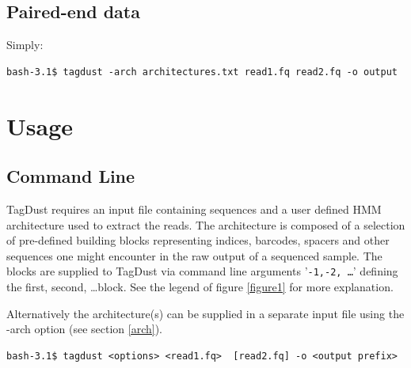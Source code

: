 \documentclass[11pt,a4paper,oneside]{book}
\begin{document}
\section{Paired-end data}

Simply:

\begin{verbatim}
bash-3.1$ tagdust -arch architectures.txt read1.fq read2.fq -o output
\end{verbatim}
 

\chapter{Usage}

\section{Command Line}
TagDust requires an input file containing sequences and a user defined HMM architecture used to extract the reads. The architecture is composed of a selection of pre-defined building blocks representing indices, barcodes, spacers and other sequences one might encounter in the raw output of a sequenced sample. The blocks are supplied to TagDust via command line arguments  '{\tt -1,-2, \dots }' defining the first, second, \dots block. See the legend of figure \ref{figure1} for more explanation. 

Alternatively the architecture(s) can be supplied in a separate input file using the -arch option (see section \ref{arch}).  

\begin{verbatim}
bash-3.1$ tagdust <options> <read1.fq>  [read2.fq] -o <output prefix> 
\end{verbatim}

\end{document}
